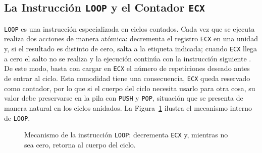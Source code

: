 \documentclass[a4paper,12pt]{article}
\begin{document}
\subsection{La Instrucción \texttt{LOOP} y el Contador \texttt{ECX}}
\texttt{LOOP} es una instrucción especializada en ciclos contados. Cada vez que se ejecuta realiza dos acciones de manera atómica: decrementa el registro \texttt{ECX} en una unidad y, si el resultado es distinto de cero, salta a la etiqueta indicada; cuando \texttt{ECX} llega a cero el salto no se realiza y la ejecución continúa con la instrucción siguiente \cite{irvine2011assembly}. De este modo, basta con cargar en \texttt{ECX} el número de repeticiones deseado antes de entrar al ciclo. Esta comodidad tiene una consecuencia, \texttt{ECX} queda reservado como contador, por lo que si el cuerpo del ciclo necesita usarlo para otra cosa, su valor debe preservarse en la pila con \texttt{PUSH} y \texttt{POP}, situación que se presenta de manera natural en los ciclos anidados. La Figura~\ref{fig:loop_ecx} ilustra el mecanismo interno de \texttt{LOOP}.

\begin{figure}[H]
\centering
{}
\caption{Mecanismo de la instrucción \texttt{LOOP}: decrementa \texttt{ECX} y, mientras no sea cero, retorna al cuerpo del ciclo.}
\label{fig:loop_ecx}
\end{figure}
\end{document}
